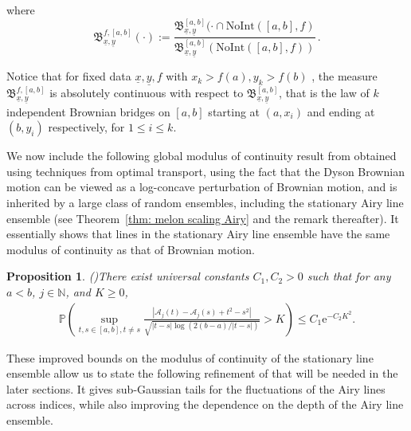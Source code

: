 \documentclass[11pt, reqno]{amsart}
\numberwithin{equation}{section}
\newcounter{dummy} \numberwithin{dummy}{section}
\newtheorem{proposition}[dummy]{Proposition}
\begin{document}
where
\begin{equation*}
\mathfrak{B}_{\underline{x},\underline{y}}^{f, [a,b]} (\cdot):=\frac{\mathfrak{B}^{[a,b]}_{\underline{x},\underline{y}}(\cdot\cap \mathrm{NoInt}([a,b], f)}{\mathfrak{B}^{[a,b]}_{\underline{x},\underline{y}}(\mathrm{NoInt}([a,b], f))}\,.\end{equation*}

Notice that for fixed data $\underline{x}, \underline{y}, f$ with $x_k> f(a), y_k> f(b)$ , the measure $\mathfrak{B}_{\underline{x},\underline{y}}^{f, [a,b]}$ is absolutely continuous with respect to $\mathfrak{B}^{[a, b]}_{\underline{x},\underline{y}}$, that is the law of $k$ independent Brownian bridges on $[a,b]$ starting at $(a,x_i)$ and ending at $(b,y_i)$ respectively, for $1\leq i\leq k$. 

We now include the following global modulus of continuity result from \cite{wu2025applicationsoptimaltransportdyson} obtained using techniques from optimal transport, using the fact that the Dyson Brownian motion can be viewed as a log-concave perturbation of Brownian motion, and is inherited by a large class of random ensembles, including the stationary Airy line ensemble (see Theorem~\ref{thm: melon scaling Airy} and the remark thereafter). It essentially shows that lines in the stationary Airy line ensemble have the same modulus of continuity as that of Brownian motion.

\begin{proposition}(\cite[Corollary 1.4]{wu2025applicationsoptimaltransportdyson})\label{prop: global modulus airy}
    There exist universal constants $C_1, C_2>0$ such that for any $a<b$, $j\in\mathbb{N}$, and  $K\geq 0$, 
    \begin{align}\label{equ:Airybeta2}
    \mathbb{P}\left( \sup_{t,s\in [a,b], t\neq s}  \frac{|\mathcal{A}_j(t)-\mathcal{A}_j(s)+t^2-s^2|}{\sqrt{|t-s| \log (2(b-a)/|t-s|)}} > K \right)\leq C_1\mathrm{e}^{-C_2K^2}.
\end{align}  
\end{proposition}

These improved bounds on the modulus of continuity of the stationary line ensemble allow us to state the following refinement of \cite[Lemma 2.3]{dauvergne2024wienerdensitiesairyline} that will be needed in the later sections. It gives sub-Gaussian tails for the fluctuations of the Airy lines across indices, while also improving the dependence on the depth of the Airy line ensemble.
\end{document}
